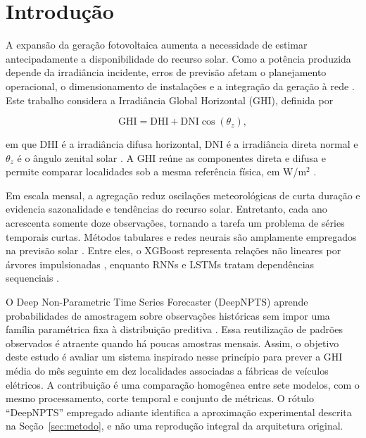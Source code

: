 \documentclass[12pt,a4paper]{article}
\begin{document}
\section{Introdução}

A expansão da geração fotovoltaica aumenta a necessidade de estimar antecipadamente a disponibilidade do recurso solar. Como a potência produzida depende da irradiância incidente, erros de previsão afetam o planejamento operacional, o dimensionamento de instalações e a integração da geração à rede \citep{antonanzas2016,voyant2017,yang2018}. Este trabalho considera a Irradiância Global Horizontal (GHI), definida por

\begin{equation}
  \mathrm{GHI}=\mathrm{DHI}+\mathrm{DNI}\cos(\theta_z),
  \label{eq:ghi}
\end{equation}

\noindent em que DHI é a irradiância difusa horizontal, DNI é a irradiância direta normal e $\theta_z$ é o ângulo zenital solar \citep{duffie2013}. A GHI reúne as componentes direta e difusa e permite comparar localidades sob a mesma referência física, em W/m$^2$ \citep{sengupta2018}.

Em escala mensal, a agregação reduz oscilações meteorológicas de curta duração e evidencia sazonalidade e tendências do recurso solar. Entretanto, cada ano acrescenta somente doze observações, tornando a tarefa um problema de séries temporais curtas. Métodos tabulares e redes neurais são amplamente empregados na previsão solar \citep{sobri2018}. Entre eles, o XGBoost representa relações não lineares por árvores impulsionadas \citep{chen2016}, enquanto RNNs e LSTMs tratam dependências sequenciais \citep{hochreiter1997}.

O Deep Non-Parametric Time Series Forecaster (DeepNPTS) aprende probabilidades de amostragem sobre observações históricas sem impor uma família paramétrica fixa à distribuição preditiva \citep{rangapuram2023}. Essa reutilização de padrões observados é atraente quando há poucas amostras mensais. Assim, o objetivo deste estudo é avaliar um sistema inspirado nesse princípio para prever a GHI média do mês seguinte em dez localidades associadas a fábricas de veículos elétricos. A contribuição é uma comparação homogênea entre sete modelos, com o mesmo processamento, corte temporal e conjunto de métricas. O rótulo ``DeepNPTS'' empregado adiante identifica a aproximação experimental descrita na Seção~\ref{sec:metodo}, e não uma reprodução integral da arquitetura original.
\end{document}
